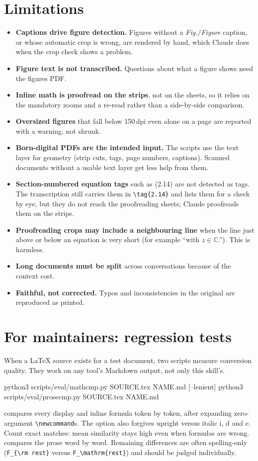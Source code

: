 \documentclass[11pt,a4paper]{article}
\begin{document}
\section{Limitations}
\begin{itemize}
\item \textbf{Captions drive figure detection.} Figures without a \emph{Fig.}/\emph{Figure}
  caption, or whose automatic crop is wrong, are rendered by hand, which Claude does when the
  crop check shows a problem.
\item \textbf{Figure text is not transcribed.} Questions about what a figure shows need the figures PDF.
\item \textbf{Inline math is proofread on the strips}, not on the sheets, so it relies on the
  mandatory zooms and a re-read rather than a side-by-side comparison.
\item \textbf{Oversized figures} that fall below 150\,dpi even alone on a page are reported
  with a warning, not shrunk.
\item \textbf{Born-digital PDFs are the intended input.} The scripts use the text layer for
  geometry (strip cuts, tags, page numbers, captions). Scanned documents without a usable text
  layer get less help from them.
\item \textbf{Section-numbered equation tags} such as (2.14) are not detected as tags. The
  transcription still carries them in \verb|\tag{2.14}| and  lists them for a
  check by eye, but they do not reach the proofreading sheets; Claude proofreads them on the
  strips.
\item \textbf{Proofreading crops may include a neighbouring line} when the line just above or
  below an equation is very short (for example ``with $z \in \mathbb{C}$.''). This is harmless.
\item \textbf{Long documents must be split} across conversations because of the context cost.
\item \textbf{Faithful, not corrected.} Typos and inconsistencies in the original are reproduced as printed.
\end{itemize}

\section{For maintainers: regression tests}
When a LaTeX source exists for a test document, two scripts measure conversion quality. They
work on any tool's Markdown output, not only this skill's.
\begin{cmd}
python3 scripts/eval/mathcmp.py SOURCE.tex NAME.md [--lenient]
python3 scripts/eval/prosecmp.py SOURCE.tex NAME.md
\end{cmd}
 compares every display and inline formula token by token, after expanding
zero-argument \verb|\newcommand|s. The  option also forgives upright versus
italic i, d and e. Count exact matches: mean similarity stays high even when formulas are
wrong.  compares the prose word by word. Remaining differences are often
spelling-only (\verb|F_{\rm rest}| versus \verb|F_\mathrm{rest}|) and should be judged
individually.
\end{document}
